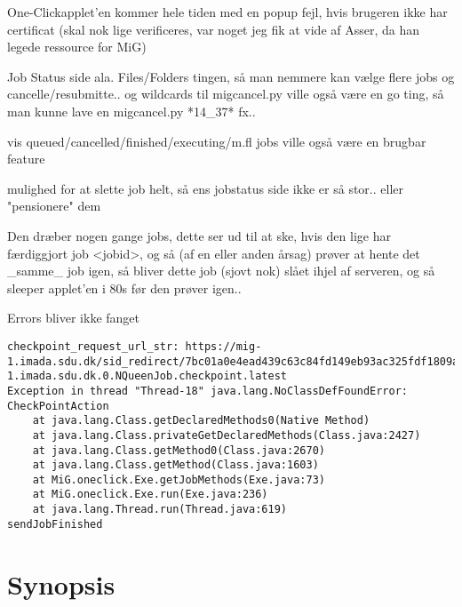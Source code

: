 \documentclass[pdf,draft,a4paper,11pt]{article}
\newcommand{\mig}{MiG}
\newcommand{\oc}{One-Click}
\begin{document}
\oc applet'en kommer hele tiden med en popup fejl, hvis brugeren ikke har
certificat (skal nok lige verificeres, var noget jeg fik at vide af Asser, da
han legede ressource for \mig)

Job Status side ala. Files/Folders
tingen, så man nemmere kan vælge flere jobs og cancelle/resubmitte.. og
wildcards til migcancel.py ville også være en go ting, så man kunne lave en
migcancel.py *14\_37* fx.. 

vis queued/cancelled/finished/executing/m.fl jobs ville også være en brugbar feature

mulighed for at slette job helt, så ens jobstatus side ikke er så stor.. eller
"pensionere" dem

Den dræber nogen gange jobs, dette ser ud til at ske, hvis den lige har
færdiggjort job <jobid>, og så (af en eller anden årsag) prøver at hente det
\_samme\_ job igen, så bliver dette job (sjovt nok) slået ihjel af serveren, og
så sleeper applet'en i 80s før den prøver igen.. 

Errors bliver ikke fanget
\begin{verbatim}
checkpoint_request_url_str: https://mig-1.imada.sdu.dk/sid_redirect/7bc01a0e4ead439c63c84fd149eb93ac325fdf1809aedc23049c010890bf14bd/13768_6_2_2007__8_42_57_mig-1.imada.sdu.dk.0.NQueenJob.checkpoint.latest
Exception in thread "Thread-18" java.lang.NoClassDefFoundError: CheckPointAction
	at java.lang.Class.getDeclaredMethods0(Native Method)
	at java.lang.Class.privateGetDeclaredMethods(Class.java:2427)
	at java.lang.Class.getMethod0(Class.java:2670)
	at java.lang.Class.getMethod(Class.java:1603)
	at MiG.oneclick.Exe.getJobMethods(Exe.java:73)
	at MiG.oneclick.Exe.run(Exe.java:236)
	at java.lang.Thread.run(Thread.java:619)
sendJobFinished
\end{verbatim}

%



\appendix


%
%
\section{Synopsis}
%


%
%
\end{document}
